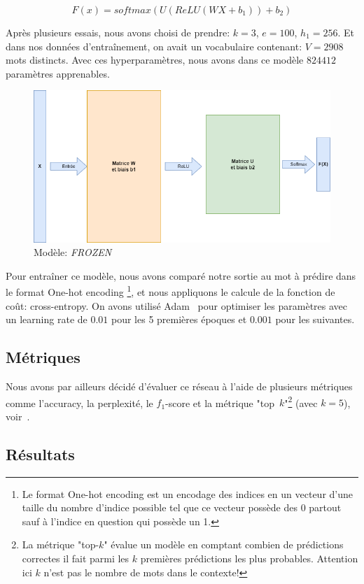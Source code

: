 \documentclass[a4paper]{article}
\begin{document}
\begin{equation}
  F(x)=softmax(U(ReLU(WX+b_1))+b_2)
  \label{eq:model1}
\end{equation}

Après plusieurs essais, nous avons choisi de prendre: $k=3$, $e=100$, $h_1=256$. Et dans nos données d'entraînement, on avait un 
vocabulaire contenant: $V=2908$ mots distincts. Avec ces hyperparamètres, nous avons dans ce modèle $824412$ paramètres apprenables.


\begin{figure}
    \centering
    \includegraphics[width=0.60\linewidth]{model1.png}
    \caption{Modèle: \textit{FROZEN}}
    \label{fig:model1}
\end{figure}

Pour entraîner ce modèle, nous avons comparé notre sortie au mot à prédire dans le format One-hot encoding
\footnote{Le format One-hot encoding est un encodage des indices en un vecteur d'une taille du nombre d'indice possible tel que 
ce vecteur possède des 0 partout sauf à l'indice en question qui possède un 1.}, et nous appliquons le calcule de la fonction de 
coût: cross-entropy. 
On avons utilisé Adam~\cite{kingma2014adam} pour optimiser les paramètres avec un learning rate de $0.01$ pour les 5 premières 
époques et $0.001$ pour les suivantes.

\subsection{Métriques}
Nous avons par ailleurs décidé d'évaluer ce réseau à l'aide de plusieurs métriques comme l'accuracy, la perplexité, le $f_1$-score 
et la métrique "top~$k$"\footnote{La métrique "top-$k$" évalue un modèle en comptant combien de prédictions correctes il fait parmi 
les $k$ premières prédictions les plus probables. Attention ici $k$ n'est pas le nombre de mots dans le contexte!} (avec $k=5$), 
voir~\cite{DBLP:journals/corr/LiuDLZ15}.

\subsection{Résultats}
\end{document}
